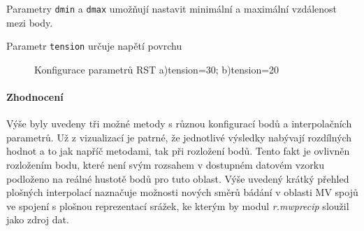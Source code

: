 \documentclass[a4paper,12pt,oneside]{report}
\begin{document}
\begin{description}
\item Parametry \texttt{dmin} a \texttt{dmax} umožňují nastavit minimální a maximální vzdálenost mezi body.
\item Parametr \texttt{tension} určuje napětí povrchu
\end{description}


\begin{figure}[h!]%
    \centering
    \qquad
    \caption[Interpolace RST]{Konfigurace parametrů RST a)tension=30; b)tension=20 \centering}%
    \label{fig:example}%
\end{figure}


\paragraph*{Zhodnocení}  Výše byly uvedeny tři možné metody s různou konfigurací bodů a interpolačních parametrů. Už z vizualizací je patrné, že jednotlivé výsledky nabývají rozdílných hodnot a to jak napříč metodami, tak při rozložení bodů. Tento fakt je  ovlivněn rozložením bodu, které není svým rozsahem v dostupném datovém vzorku podloženo na reálné hustotě bodů pro tuto oblast. Výše uvedený krátký přehled plošných interpolací naznačuje možnosti nových směrů bádání v oblasti MV spojů ve spojení s plošnou reprezentací srážek, ke kterým by modul \textit{r.mwprecip} sloužil jako zdroj dat.
\end{document}
